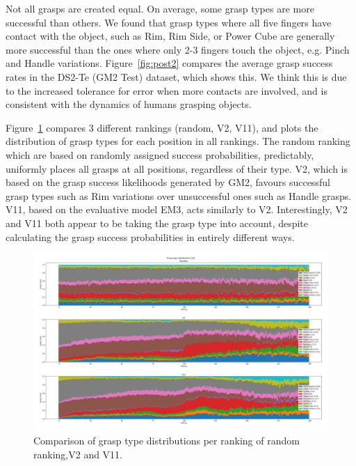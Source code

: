 Not all grasps are created equal. On average, some grasp types are more successful than others. We found that grasp types where all five fingers have contact with the object, such as Rim, Rim Side, or Power Cube are generally more successful than the ones where only 2-3 fingers touch the object, e.g. Pinch and Handle variations. Figure~\ref{fig:post2} compares the average grasp success rates in the DS2-Te (GM2 Test) dataset, which shows this. We think this is due to the increased tolerance for error when more contacts are involved, and is consistent with the dynamics of humans grasping objects. 

Figure~\ref{fig:post6} compares 3 different rankings (random, V2, V11), and plots the distribution of grasp types for each position in all rankings. The random ranking which are based on randomly assigned success probabilities, predictably, uniformly places all grasps at all positions, regardless of their type. V2, which is based on the grasp success likelihoods generated by GM2, favours successful grasp types such as Rim variations over unsuccessful ones such as Handle grasps. V11, based on the evaluative model EM3, acts similarly to V2. Interestingly, V2 and V11 both appear to be taking the grasp type into account, despite calculating the grasp success probabilities in entirely different ways.

\begin{figure}
\centering
\includegraphics[width=0.8\columnwidth]{images/post-analysis/Grasp_type_distributions_all.png}
\caption{Comparison of grasp type distributions per ranking of random ranking,V2 and V11.}
\label{fig:post6}
\end{figure}


